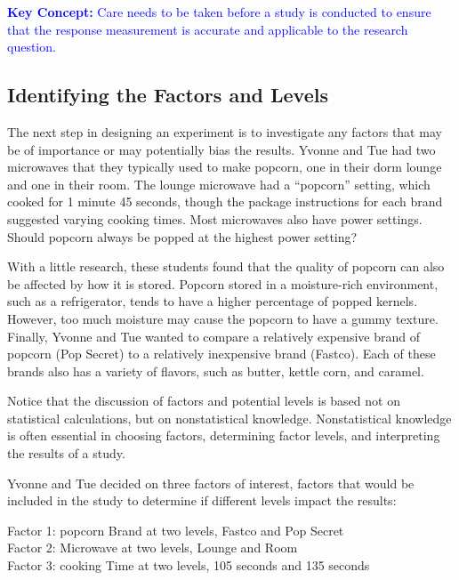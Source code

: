 \documentclass[
]{report}
\begin{document}
\textbf{\textcolor{blue}{Key Concept:}} \textcolor{blue}{Care needs to be taken before a study is conducted to ensure that the response measurement is accurate and applicable to the research question.}

\hypertarget{identifying-the-factors-and-levels}{%
\subsection*{Identifying the Factors and Levels}\label{identifying-the-factors-and-levels}}

The next step in designing an experiment is to investigate any factors that may be of importance or may potentially bias the results. Yvonne and Tue had two microwaves that they typically used to make popcorn, one in their dorm lounge and one in their room. The lounge microwave had a ``popcorn'' setting, which cooked for 1 minute 45 seconds, though the package instructions for each brand suggested varying cooking times. Most microwaves also have power settings. Should popcorn always be popped at the highest power setting?

With a little research, these students found that the quality of popcorn can also be affected by how it is stored. Popcorn stored in a moisture-rich environment, such as a refrigerator, tends to have a higher percentage of popped kernels. However, too much moisture may cause the popcorn to have a gummy texture. Finally, Yvonne and Tue wanted to compare a relatively expensive brand of popcorn (Pop Secret) to a relatively inexpensive brand (Fastco). Each of these brands also has a variety of flavors, such as butter, kettle corn, and caramel.

Notice that the discussion of factors and potential levels is based not on statistical calculations, but on nonstatistical knowledge. Nonstatistical knowledge is often essential in choosing factors, determining factor levels, and interpreting the results of a study.

Yvonne and Tue decided on three factors of interest, factors that would be included in the study to determine if different levels impact the results:

Factor 1: popcorn Brand at two levels, Fastco and Pop Secret\\
Factor 2: Microwave at two levels, Lounge and Room\\
Factor 3: cooking Time at two levels, 105 seconds and 135 seconds
\end{document}

